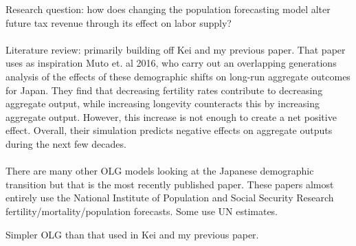 \documentclass{article}
\renewcommand{\thesection}{\Roman{section}}
\numberwithin{equation}{subsection}
\renewcommand{\section}[2][]{\oldsection[#1]{#2}\index{#1}\label{sec:\thesection}}
\begin{document}
\section{Introduction}

Research question: how does changing the population forecasting model alter future tax revenue through its effect on labor supply?
\\\\
Literature review: primarily building off Kei and my previous paper. That paper uses as inspiration Muto et. al 2016, who carry out an overlapping generations analysis of the effects of these demographic shifts on long-run aggregate outcomes for Japan. They find that decreasing fertility rates contribute to decreasing aggregate output, while increasing longevity counteracts this by increasing aggregate output.  However, this increase is not enough to create a net positive effect. Overall, their simulation predicts negative effects on aggregate outputs during the next few decades.
\\\\
There are many other OLG models looking at the Japanese demographic transition but that is the most recently published paper. These papers almost entirely use the National Institute of Population and Social Security Research fertility/mortality/population forecasts. Some use UN estimates.


\section{Model}

Simpler OLG than that used in Kei and my previous paper.


\section{Data}
\end{document}
